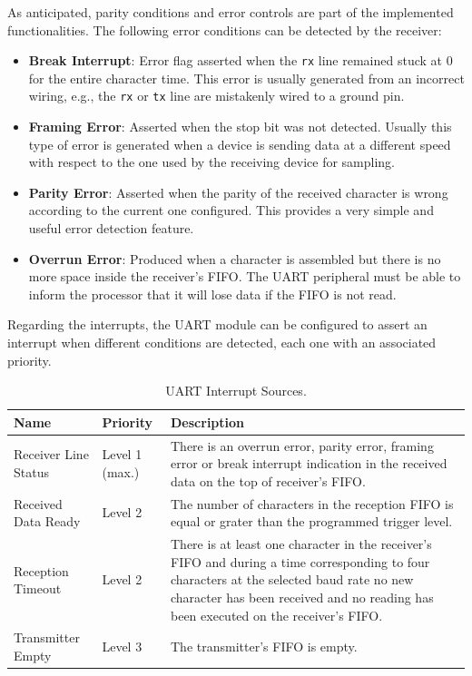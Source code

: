 As anticipated, parity conditions and error controls are part of the implemented functionalities. The following error conditions can be detected by the receiver:

\begin{itemize}
\item \textbf{Break Interrupt}: Error flag asserted when the \texttt{rx} line remained stuck at 0 for the entire character time. This error is usually generated from an incorrect wiring, e.g., the \texttt{rx} or \texttt{tx} line are mistakenly wired to a ground pin.
\item \textbf{Framing Error}: Asserted when the stop bit was not detected. Usually this type of error is generated when a device is sending data at a different speed with respect to the one used by the receiving device for sampling.
\item \textbf{Parity Error}: Asserted when the parity of the received character is wrong according to the current one configured. This provides a very simple and useful error detection feature.
\item \textbf{Overrun Error}: Produced when a character is assembled but there is no more space inside the receiver's FIFO. The UART peripheral must be able to inform the processor that it will lose data if the FIFO is not read.
\end{itemize}

Regarding the interrupts, the UART module can be configured to assert an interrupt when different conditions are detected, each one with an associated priority.

\begin{table}
\centering
\begin{tabular}{| p{2cm} | p{2cm} | p{7cm} |}
    \hline
    \textbf{Name} & \textbf{Priority} & \textbf{Description} \\ \hline
    Receiver Line Status & Level 1 (max.) &  There is an overrun error, parity error, framing error or break interrupt indication in the received data on the top of receiver's FIFO.  \\ \hline
    Received Data Ready & Level 2 &  The number of characters in the reception FIFO is equal or grater than the programmed trigger level.  \\ \hline
    Reception Timeout & Level 2 &  There is at least one character in the receiver’s FIFO and during a time corresponding to four characters at the selected baud rate no new character has been received and no reading has been executed on the receiver’s FIFO.  \\ \hline
    Transmitter Empty & Level 3 &  The transmitter's FIFO is empty.  \\ \hline
    \hline
\end{tabular}
\caption{UART Interrupt Sources.}
\label{tab:uartint} %
\end{table}

